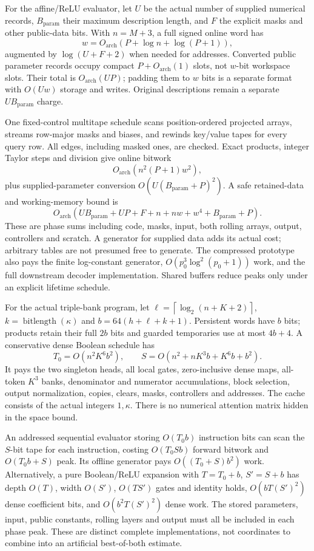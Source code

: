 \documentclass[11pt,letterpaper]{article}
\theoremstyle{definition}\newtheorem{definition}[theorem]{Definition}
\theoremstyle{remark}\newtheorem{remark}[theorem]{Remark}
\newcommand{\ceil}[1]{\left\lceil #1\right\rceil}
\newcommand{\bl}{\operatorname{bitlength}}
\begin{document}
For the affine/ReLU evaluator, let $U$ be the actual number of supplied numerical records, $B_{\mathrm{param}}$ their maximum description length, and $F$ the explicit masks and other public-data bits. With $n=M+3$, a full signed online word has
\[
 w=O_{\mathrm{arch}}(P+\log n+\log(P+1)),
\]
augmented by $\log(U+F+2)$ when needed for addresses. Converted public parameter records occupy compact $P+O_{\mathrm{arch}}(1)$ slots, not $w$-bit workspace slots. Their total is $O_{\mathrm{arch}}(UP)$; padding them to $w$ bits is a separate format with $O(Uw)$ storage and writes. Original descriptions remain a separate $UB_{\mathrm{param}}$ charge.

One fixed-control multitape schedule scans position-ordered projected arrays, streams row-major masks and biases, and rewinds key/value tapes for every query row. All edges, including masked ones, are checked. Exact products, integer Taylor steps and division give online bitwork
\[
 O_{\mathrm{arch}}(n^2(P+1)w^2),
\]
plus supplied-parameter conversion $O(U(B_{\mathrm{param}}+P)^2)$. A safe retained-data and working-memory bound is
\[
 O_{\mathrm{arch}}(UB_{\mathrm{param}}+UP+F+n+nw+w^4+B_{\mathrm{param}}+P).
\]
These are phase sums including code, masks, input, both rolling arrays, output, controllers and scratch. A generator for supplied data adds its actual cost; arbitrary tables are not presumed free to generate. The compressed prototype also pays the finite log-constant generator, $O(p_0^3\log^2(p_0+1))$ work, and the full downstream decoder implementation. Shared buffers reduce peaks only under an explicit lifetime schedule.

For the actual triple-bank program, let $\ell=\ceil{\log_2(n+K+2)}$, $k=\bl(\kappa)$ and $b=64(h+\ell+k+1)$. Persistent words have $b$ bits; products retain their full $2b$ bits and guarded temporaries use at most $4b+4$. A conservative dense Boolean schedule has
\begin{equation}\label{eq:costtriple}
 T_0=O(n^2K^6b^2),\qquad
 S=O(n^2+nK^3b+K^6b+b^2).
\end{equation}
It pays the two singleton heads, all local gates, zero-inclusive dense maps, all-token $K^3$ banks, denominator and numerator accumulations, block selection, output normalization, copies, clears, masks, controllers and addresses. The cache consists of the actual integers $1,\kappa$. There is no numerical attention matrix hidden in the space bound.

An addressed sequential evaluator storing $O(T_0b)$ instruction bits can scan the $S$-bit tape for each instruction, costing $O(T_0Sb)$ forward bitwork and $O(T_0b+S)$ peak. Its offline generator pays $O((T_0+S)b^2)$ work. Alternatively, a pure Boolean/ReLU expansion with $T=T_0+b$, $S'=S+b$ has depth $O(T)$, width $O(S')$, $O(TS')$ gates and identity holds, $O(bT(S')^2)$ dense coefficient bits, and $O(b^2T(S')^2)$ dense work. The stored parameters, input, public constants, rolling layers and output must all be included in each phase peak. These are distinct complete implementations, not coordinates to combine into an artificial best-of-both estimate.
\end{document}
